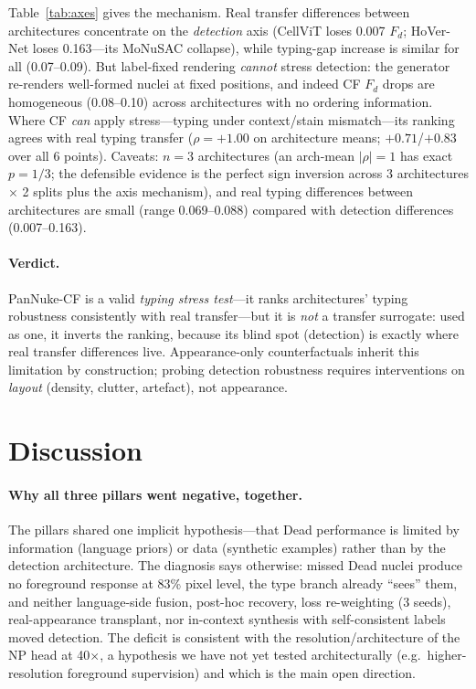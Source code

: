 \documentclass[11pt]{article}
\begin{document}
Table~\ref{tab:axes} gives the mechanism. Real transfer differences between architectures
concentrate on the \emph{detection} axis (CellViT loses 0.007 $F_d$; HoVer-Net loses 0.163---its
MoNuSAC collapse), while typing-gap increase is similar for all (0.07--0.09). But label-fixed
rendering \emph{cannot} stress detection: the generator re-renders well-formed nuclei at fixed
positions, and indeed CF $F_d$ drops are homogeneous (0.08--0.10) across architectures with no
ordering information. Where CF \emph{can} apply stress---typing under context/stain
mismatch---its ranking agrees with real typing transfer ($\rho=+1.00$ on architecture means;
$+0.71$/$+0.83$ over all 6 points). Caveats: $n=3$ architectures (an arch-mean
$|\rho|=1$ has exact $p=1/3$; the defensible evidence is the perfect sign inversion across
3 architectures $\times$ 2 splits plus the axis mechanism), and real typing differences between
architectures are small (range 0.069--0.088) compared with detection differences (0.007--0.163).

\paragraph{Verdict.} PanNuke-CF is a valid \emph{typing stress test}---it ranks architectures'
typing robustness consistently with real transfer---but it is \emph{not} a transfer surrogate:
used as one, it inverts the ranking, because its blind spot (detection) is exactly where real
transfer differences live. Appearance-only counterfactuals inherit this limitation by
construction; probing detection robustness requires interventions on \emph{layout} (density,
clutter, artefact), not appearance.

\section{Discussion}
\label{sec:discussion}

\paragraph{Why all three pillars went negative, together.} The pillars shared one implicit
hypothesis---that Dead performance is limited by information (language priors) or data
(synthetic examples) rather than by the detection architecture. The diagnosis says otherwise:
missed Dead nuclei produce no foreground response at 83\% pixel level, the type branch
already ``sees'' them, and neither language-side fusion, post-hoc recovery, loss re-weighting
(3 seeds), real-appearance transplant, nor in-context synthesis with self-consistent labels
moved detection. The deficit is consistent with the resolution/architecture of the NP head at
40$\times$, a hypothesis we have not yet tested architecturally (e.g.\ higher-resolution
foreground supervision) and which is the main open direction.
\end{document}
